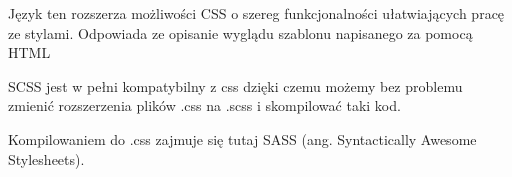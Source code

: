Język ten rozszerza możliwości CSS o szereg funkcjonalności ułatwiających pracę ze stylami. Odpowiada ze opisanie wyglądu szablonu napisanego za pomocą HTML 

SCSS jest w pełni kompatybilny z css dzięki czemu możemy bez problemu zmienić rozszerzenia plików .css na .scss i skompilować taki kod. 

Kompilowaniem do .css zajmuje się tutaj SASS (ang. Syntactically Awesome Stylesheets).